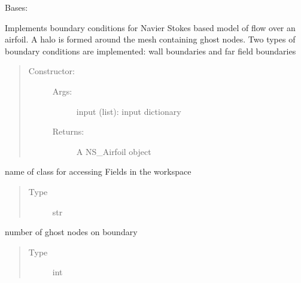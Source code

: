 \documentclass[letterpaper,10pt,english]{sphinxmanual}
\begin{document}
\begin{fulllineitems}
\label{\detokenize{autoapi/NS_Airfoil/index:NS_Airfoil.NS_Airfoil}}
\sphinxAtStartPar
Bases: 

\sphinxAtStartPar
Implements boundary conditions for Navier Stokes based model of flow over an airfoil.
A halo is formed around the mesh containing ghost nodes. Two types of boundary conditions
are implemented: wall boundaries and far field boundaries
\begin{quote}
\begin{description}
\item[{Constructor:}] \leavevmode\begin{description}
\item[{Args:}] \leavevmode
\sphinxAtStartPar
input (list): input dictionary

\item[{Returns:}] \leavevmode
\sphinxAtStartPar
A NS\_Airfoil object

\end{description}

\end{description}
\end{quote}

\begin{fulllineitems}
\label{\detokenize{autoapi/NS_Airfoil/index:NS_Airfoil.NS_Airfoil.class_name}}
\sphinxAtStartPar
name of class for accessing Fields in the workspace
\begin{quote}\begin{description}
\item[{Type}] \leavevmode
\sphinxAtStartPar
str

\end{description}\end{quote}

\end{fulllineitems}


\begin{fulllineitems}
\label{\detokenize{autoapi/NS_Airfoil/index:NS_Airfoil.NS_Airfoil.padding}}
\sphinxAtStartPar
number of ghost nodes on boundary
\begin{quote}\begin{description}
\item[{Type}] \leavevmode
\sphinxAtStartPar
int


\end{description}
\end{quote}
\end{fulllineitems}
\end{fulllineitems}
\end{document}
